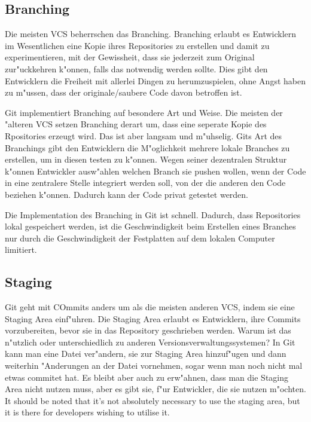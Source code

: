 \subsection{Branching}

Die meisten VCS beherrschen das Branching. Branching erlaubt es Entwicklern im Wesentlichen eine Kopie ihres Repositories zu erstellen und damit zu experimentieren,
mit der Gewissheit, dass sie jederzeit zum Original zur"uckkehren k"onnen, falls das notwendig werden sollte. Dies gibt den Entwicklern die Freiheit mit allerlei
Dingen zu herumzuspielen, ohne Angst haben zu m"ussen, dass der originale/saubere Code davon betroffen ist.

Git implementiert Branching auf besondere Art und Weise. Die meisten der "alteren VCS setzen Branching derart um, dass eine seperate Kopie des Rpositories
erzeugt wird. Das ist aber langsam und m"uhselig. Gits Art des Branchings gibt den Entwicklern die M"oglichkeit mehrere lokale Branches zu erstellen, um in diesen
testen zu k"onnen. Wegen seiner dezentralen Struktur k"onnen Entwickler ausw"ahlen welchen Branch sie pushen wollen, wenn der Code in eine zentralere Stelle
integriert werden soll, von der die anderen den Code beziehen k"onnen. Dadurch kann der Code privat getestet werden.

Die Implementation des Branching in Git ist schnell. Dadurch, dass Repositories lokal gespeichert werden, ist die Geschwindigkeit beim Erstellen eines Branches nur
durch die Geschwindigkeit der Festplatten auf dem lokalen Computer limitiert.

\subsection{Staging}

Git geht mit COmmits anders um als die meisten anderen VCS, indem sie eine Staging Area einf"uhren. Die Staging Area erlaubt es Entwicklern, ihre Commits
vorzubereiten, bevor sie in das Repository geschrieben werden. Warum ist das n"utzlich oder unterschiedlich zu anderen Versionsverwaltungssystemen? In Git kann man
eine Datei ver"andern, sie zur Staging Area hinzuf"ugen und dann weiterhin "Anderungen an der Datei vornehmen, sogar wenn man noch nicht mal etwas commitet hat. Es
bleibt aber auch zu erw"ahnen, dass man die Staging Area nicht nutzen muss, aber es gibt sie, f"ur Entwickler, die sie nutzen m"ochten.
It should be noted that it's not absolutely necessary to use the staging area, but it is there for developers wishing to utilise it.

